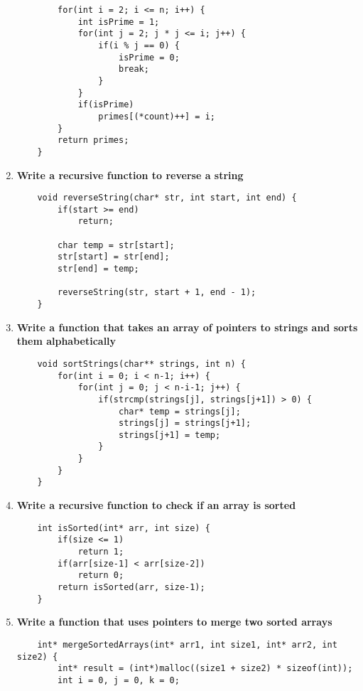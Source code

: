 \documentclass{article}
\begin{document}
\begin{enumerate}
\begin{lstlisting}
        for(int i = 2; i <= n; i++) {
            int isPrime = 1;
            for(int j = 2; j * j <= i; j++) {
                if(i % j == 0) {
                    isPrime = 0;
                    break;
                }
            }
            if(isPrime)
                primes[(*count)++] = i;
        }
        return primes;
    }
    \end{lstlisting}

    \item \textbf{Write a recursive function to reverse a string}
    \begin{lstlisting}
    void reverseString(char* str, int start, int end) {
        if(start >= end)
            return;
        
        char temp = str[start];
        str[start] = str[end];
        str[end] = temp;
        
        reverseString(str, start + 1, end - 1);
    }
    \end{lstlisting}

    \item \textbf{Write a function that takes an array of pointers to strings and sorts them alphabetically}
    \begin{lstlisting}
    void sortStrings(char** strings, int n) {
        for(int i = 0; i < n-1; i++) {
            for(int j = 0; j < n-i-1; j++) {
                if(strcmp(strings[j], strings[j+1]) > 0) {
                    char* temp = strings[j];
                    strings[j] = strings[j+1];
                    strings[j+1] = temp;
                }
            }
        }
    }
    \end{lstlisting}

    \item \textbf{Write a recursive function to check if an array is sorted}
    \begin{lstlisting}
    int isSorted(int* arr, int size) {
        if(size <= 1)
            return 1;
        if(arr[size-1] < arr[size-2])
            return 0;
        return isSorted(arr, size-1);
    }
    \end{lstlisting}

    \item \textbf{Write a function that uses pointers to merge two sorted arrays}
    \begin{lstlisting}
    int* mergeSortedArrays(int* arr1, int size1, int* arr2, int size2) {
        int* result = (int*)malloc((size1 + size2) * sizeof(int));
        int i = 0, j = 0, k = 0;
        

\end{lstlisting}
\end{enumerate}
\end{document}
